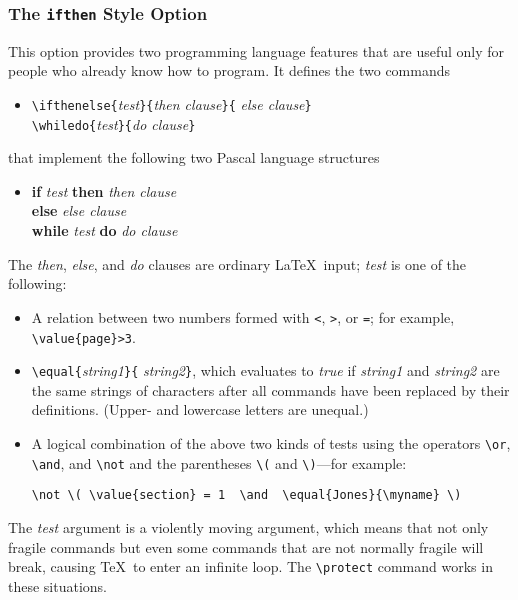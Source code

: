 \subsubsection{The {\tt ifthen} Style Option}

This option provides two programming language features that are useful
only for people who already know how to program.  It defines the
two commands
\begin{itemize}
\item[]
\verb|\ifthenelse{|{\em test\/}\verb|}{|{\em then clause\/}\verb|}{|%
{\em else clause\/}\verb|}|\\
\verb|\whiledo{|{\em test\/}\verb|}{|{\em do clause\/}\verb|}|
\end{itemize}
that implement the following two Pascal language structures
\begin{itemize}
\item[]
\begin{tabbing}
{\bf if} {\em test\/} \= {\bf then} \= {\em then clause\/} \\
 \> {\bf else} \> {\em else clause\/} \\[2pt]
{\bf while} {\em test\/} {\bf do} {\em do clause\/}
\end{tabbing}
\end{itemize}
The {\em then\/}, {\em else\/}, and {\em do\/} clauses
are ordinary \LaTeX\ input; {\em test\/} is one of the following:
\begin{itemize}
 \item A relation between two numbers formed with {\tt <}, {\tt >},
or {\tt =}; for example, \hbox{\verb|\value{page}>3|}.
 \item \verb|\equal{|{\em string1\/}\verb|}{|%
{\em string2\/}\verb|}|, which evaluates to {\em true\/} if {\em
string1\/} and {\em string2\/} are the same strings of characters after
all commands have been replaced by their definitions.  (Upper- and
lowercase letters are unequal.)
 \item A logical combination of the above two kinds of tests
    using the operators \hbox{\verb|\or|}, \hbox{\verb|\and|},
    and \hbox{\verb|\not|} and the parentheses \hbox{\verb|\(|}
    and \hbox{\verb|\)|}---for example:
\begin{verbatim}
\not \( \value{section} = 1  \and  \equal{Jones}{\myname} \)
\end{verbatim}
\end{itemize}
The {\em test\/} argument is a violently moving argument, which means
that not only fragile commands but even some commands that are not
normally fragile will break, causing \TeX\ to enter an infinite loop.
The \verb|\protect| command works in these situations.


